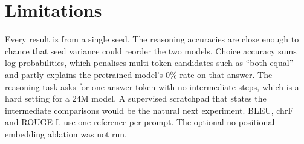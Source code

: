 \documentclass[10pt,a4paper]{article}
\begin{document}
\section{Limitations}
Every result is from a single seed. The reasoning accuracies are close enough to chance that seed variance could reorder the two models.
Choice accuracy sums log-probabilities, which penalises multi-token candidates such as ``both equal'' and partly explains the pretrained model's 0\% rate on that answer.
The reasoning task asks for one answer token with no intermediate steps, which is a hard setting for a 24M model. A supervised scratchpad that states the intermediate comparisons would be the natural next experiment.
BLEU, chrF and ROUGE-L use one reference per prompt.
The optional no-positional-embedding ablation was not run.

\end{document}
